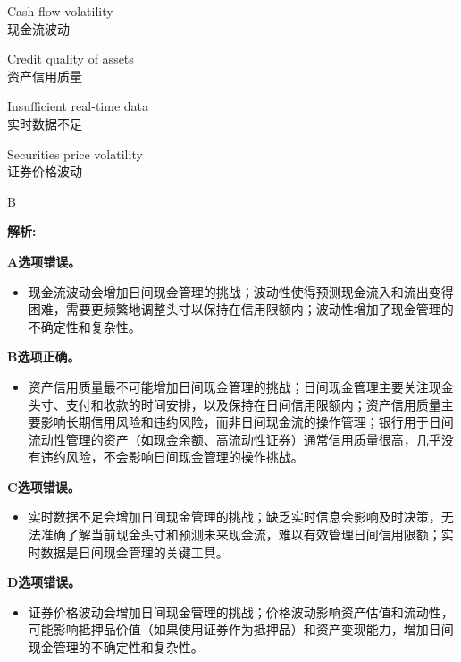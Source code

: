 \documentclass{article}
\newenvironment{explanation}
{\textbf{解析:}\par}
{\par}
\begin{document}
\begin{choices}
    \item Cash flow volatility\\
    现金流波动
    \item Credit quality of assets\\
    资产信用质量
    \item Insufficient real-time data\\
    实时数据不足
    \item Securities price volatility\\
    证券价格波动
\end{choices}

\begin{correctanswer}
    B
\end{correctanswer}

\begin{explanation}
    \textbf{A选项错误。}
    \begin{itemize}
        \item 现金流波动会增加日间现金管理的挑战；波动性使得预测现金流入和流出变得困难，需要更频繁地调整头寸以保持在信用限额内；波动性增加了现金管理的不确定性和复杂性。
    \end{itemize}

    \textbf{B选项正确。}
    \begin{itemize}
        \item 资产信用质量最不可能增加日间现金管理的挑战；日间现金管理主要关注现金头寸、支付和收款的时间安排，以及保持在日间信用限额内；资产信用质量主要影响长期信用风险和违约风险，而非日间现金流的操作管理；银行用于日间流动性管理的资产（如现金余额、高流动性证券）通常信用质量很高，几乎没有违约风险，不会影响日间现金管理的操作挑战。
    \end{itemize}

    \textbf{C选项错误。}
    \begin{itemize}
        \item 实时数据不足会增加日间现金管理的挑战；缺乏实时信息会影响及时决策，无法准确了解当前现金头寸和预测未来现金流，难以有效管理日间信用限额；实时数据是日间现金管理的关键工具。
    \end{itemize}

    \textbf{D选项错误。}
    \begin{itemize}
        \item 证券价格波动会增加日间现金管理的挑战；价格波动影响资产估值和流动性，可能影响抵押品价值（如果使用证券作为抵押品）和资产变现能力，增加日间现金管理的不确定性和复杂性。
    \end{itemize}
\end{explanation}
\end{document}
